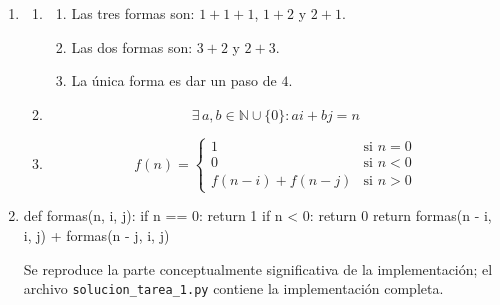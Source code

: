 \begin{enumerate}
  \item
  \begin{enumerate}
    \item
    \begin{enumerate}[start=1, label=Caso \arabic*:, leftmargin=*]
      \item Las tres formas son: $1+1+1$, $1+2$ y $2+1$.
      \item Las dos formas son: $3+2$ y $2+3$.
      \item La única forma es dar un paso de $4$.
    \end{enumerate}

    \item
    \[
    \exists\, a, b \in \mathbb{N} \cup \{0\} : ai + bj = n
    \]

    \item
    \[
    f(n) =
    \begin{cases}
    1 & \text{si } n = 0 \\
    0 & \text{si } n < 0 \\
    f(n - i) + f(n - j) & \text{si } n > 0
    \end{cases}
    \]
  \end{enumerate}

  \item 
  \leavevmode
  \begin{pseudocode}
def formas(n, i, j):
    if n == 0: return 1
    if n < 0: return 0
    return formas(n - i, i, j) + formas(n - j, i, j)
  \end{pseudocode}
  
  {\small Se reproduce la parte conceptualmente significativa de la implementación; el archivo \texttt{solucion\_tarea\_1.py} contiene la implementación completa.}
\end{enumerate}

